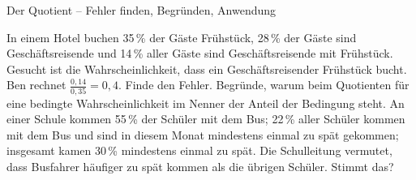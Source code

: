 \begin{aufgabe}{Der Quotient – Fehler finden, Begründen, Anwendung}
\begin{teile}
\teil In einem Hotel buchen 35\,\% der Gäste Frühstück, 28\,\% der Gäste sind Geschäftsreisende und 14\,\% aller Gäste sind Geschäftsreisende mit Frühstück. Gesucht ist die Wahrscheinlichkeit, dass ein Geschäftsreisender Frühstück bucht. Ben rechnet $\frac{0{,}14}{0{,}35} = 0{,}4$. Finde den Fehler.
\teil Begründe, warum beim Quotienten für eine bedingte Wahrscheinlichkeit im Nenner der Anteil der Bedingung steht.
\teil An einer Schule kommen 55\,\% der Schüler mit dem Bus; 22\,\% aller Schüler kommen mit dem Bus und sind in diesem Monat mindestens einmal zu spät gekommen; insgesamt kamen 30\,\% mindestens einmal zu spät. Die Schulleitung vermutet, dass Busfahrer häufiger zu spät kommen als die übrigen Schüler. Stimmt das?
\end{teile}
\end{aufgabe}
